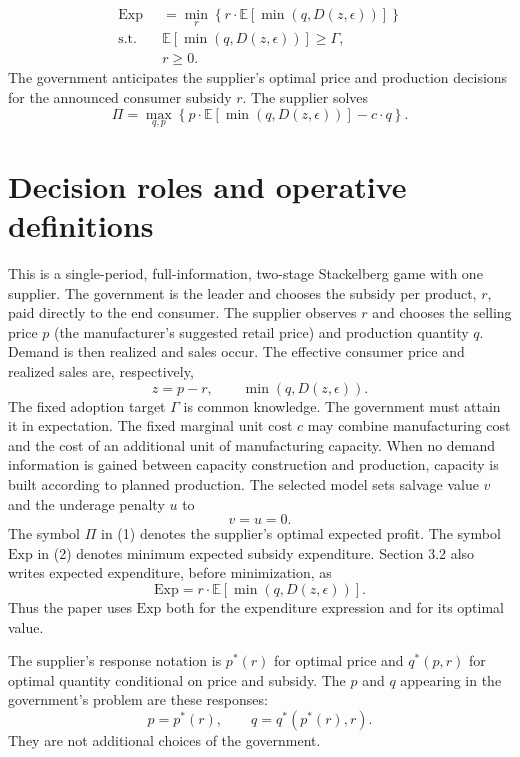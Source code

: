 \documentclass{article}
\begin{document}
\begin{equation}
\begin{aligned}
\mathrm{Exp}
&=\min_r\left\{r\cdot\mathbb{E}\left[\min(q,D(z,\epsilon))\right]\right\}\\
\text{s.t.}\quad
&\mathbb{E}\left[\min(q,D(z,\epsilon))\right]\geq\Gamma,\\
&r\geq 0.
\end{aligned}
\tag{2}
\end{equation}
The government anticipates the supplier's optimal price and production decisions for the announced consumer subsidy $r$. The supplier solves
\begin{equation}
\Pi=\max_{q,p}\left\{p\cdot\mathbb{E}\left[\min(q,D(z,\epsilon))\right]-c\cdot q\right\}.
\tag{1}
\end{equation}

\section*{Decision roles and operative definitions}
This is a single-period, full-information, two-stage Stackelberg game with one supplier. The government is the leader and chooses the subsidy per product, $r$, paid directly to the end consumer. The supplier observes $r$ and chooses the selling price $p$ (the manufacturer's suggested retail price) and production quantity $q$. Demand is then realized and sales occur. The effective consumer price and realized sales are, respectively,
\[
z=p-r,
\qquad
\min(q,D(z,\epsilon)).
\]
The fixed adoption target $\Gamma$ is common knowledge. The government must attain it in expectation. The fixed marginal unit cost $c$ may combine manufacturing cost and the cost of an additional unit of manufacturing capacity. When no demand information is gained between capacity construction and production, capacity is built according to planned production. The selected model sets salvage value $v$ and the underage penalty $u$ to
\[
v=u=0.
\]
The symbol $\Pi$ in (1) denotes the supplier's optimal expected profit. The symbol $\mathrm{Exp}$ in (2) denotes minimum expected subsidy expenditure. Section 3.2 also writes expected expenditure, before minimization, as
\begin{equation}
\mathrm{Exp}=r\cdot\mathbb{E}\left[\min(q,D(z,\epsilon))\right].
\tag{5}
\end{equation}
Thus the paper uses $\mathrm{Exp}$ both for the expenditure expression and for its optimal value.

The supplier's response notation is $p^*(r)$ for optimal price and $q^*(p,r)$ for optimal quantity conditional on price and subsidy. The $p$ and $q$ appearing in the government's problem are these responses:
\[
p=p^*(r),
\qquad
q=q^*(p^*(r),r).
\]
They are not additional choices of the government.
\end{document}
